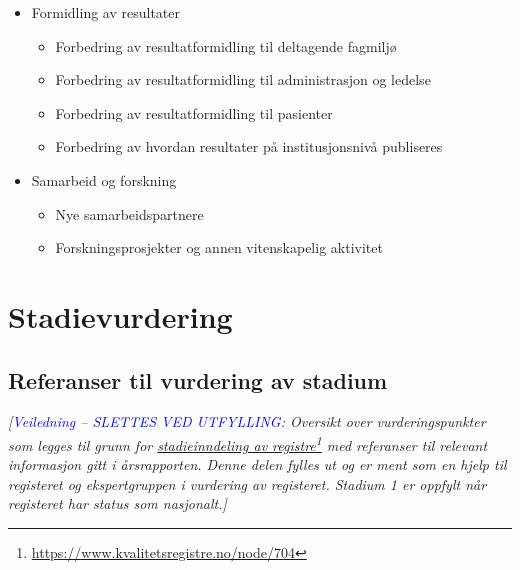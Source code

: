 \documentclass[norsk, a4paper, twocolumn]{report}
\newcommand{\newtext}[1]{\cbstart\textcolor{blue}{#1\cbend}}
\newcommand{\guide}[1] {
	\textit{[\textcolor{guidegray}{\newtext{Veiledning -- SLETTES VED UTFYLLING:} #1}]}
	}
\begin{document}
\begin{itemize}
\begin{itemize}
    \end{itemize}
  \item Formidling av resultater
    \begin{itemize}
      \item Forbedring av resultatformidling til deltagende fagmiljø
      \item Forbedring av resultatformidling til administrasjon og ledelse
      \item Forbedring av resultatformidling til pasienter
      \item Forbedring av hvordan resultater på institusjonsnivå
        publiseres
    \end{itemize}
  \item Samarbeid og forskning
    \begin{itemize}
      \item Nye samarbeidspartnere
      \item Forskningsprosjekter og annen vitenskapelig aktivitet
    \end{itemize}
\end{itemize}




\part{Stadievurdering}


\chapter{Referanser til vurdering av stadium}
\guide{Oversikt over vurderingspunkter som legges til grunn for
\href{https://www.kvalitetsregistre.no/node/704}{stadieinndeling av registre}\footnote{\url{https://www.kvalitetsregistre.no/node/704}}
med referanser til relevant informasjon
gitt i årsrapporten. Denne delen fylles ut og er ment som en
hjelp til registeret og ekspertgruppen i vurdering av registeret. Stadium 1
er oppfylt når registeret har status som nasjonalt.}

\bigskip
\bigskip
\end{document}
